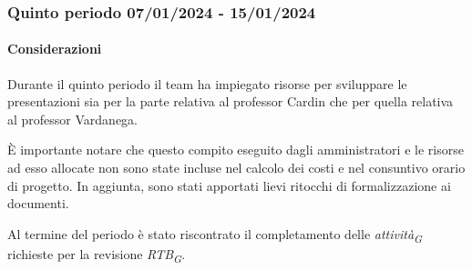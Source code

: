 

\subsubsection{Quinto periodo  07/01/2024 - 15/01/2024}
\paragraph{Considerazioni}
Durante il quinto periodo il team ha impiegato risorse per sviluppare le presentazioni sia per la parte relativa al professor Cardin che per quella relativa al professor Vardanega.

\vspace{0.2cm}

È importante notare che questo compito eseguito dagli amministratori e le risorse ad esso allocate non sono state incluse nel calcolo dei costi e nel consuntivo orario di progetto. 
In aggiunta, sono stati apportati lievi ritocchi di formalizzazione ai documenti.

\vspace{0.2cm}

Al termine del periodo è stato riscontrato il completamento delle \textit{attività}\textsubscript{\textit{G}} richieste per la revisione \textit{RTB}\textsubscript{\textit{G}}.

\pagebreak

